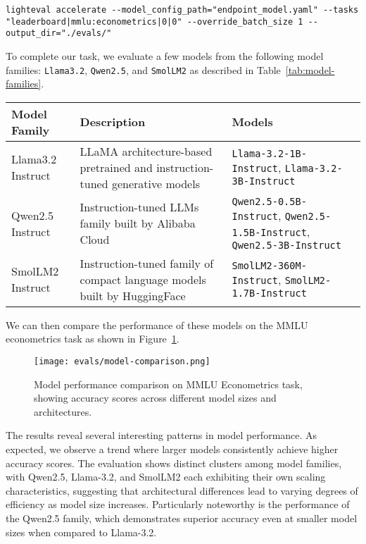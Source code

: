 \begin{verbatim}
lighteval accelerate --model_config_path="endpoint_model.yaml" --tasks "leaderboard|mmlu:econometrics|0|0" --override_batch_size 1 --output_dir="./evals/"
\end{verbatim}

To complete our task, we evaluate a few models from the following model families: \texttt{Llama3.2}, \texttt{Qwen2.5}, and \texttt{SmolLM2} as described in Table~\ref{tab:model-families}.

\begin{table*}[h]
    \begin{tabular}{lp{5.5cm}p{4.5cm}}
    \hline
    Model Family & Description & Models \\
    \hline
    Llama3.2 Instruct \cite{meta_llama_models} & LLaMA architecture-based \newline pretrained and instruction-tuned \newline generative models & \texttt{Llama-3.2-1B-Instruct}, 
    \texttt{Llama-3.2-3B-Instruct} \\
    \hline
    Qwen2.5 Instruct \cite{gpt2docs,hui2024qwen2,qwen2} & Instruction-tuned LLMs family \newline built by Alibaba Cloud & \texttt{Qwen2.5-0.5B-Instruct}, \texttt{Qwen2.5-1.5B-Instruct}, \texttt{Qwen2.5-3B-Instruct} \\
    \hline
    SmolLM2 Instruct \cite{allal2024SmolLM2}  & Instruction-tuned family of \newline compact language models \newline built by HuggingFace & \texttt{SmolLM2-360M-Instruct}, \texttt{SmolLM2-1.7B-Instruct} \\
    \hline
    \end{tabular}
    \caption{Model Families Evaluated Using LightEval}
    \label{tab:model-families}
    \end{table*}
We can then compare the performance of these models on the MMLU econometrics task as shown in Figure~\ref{fig:model-comparison}.

\begin{figure}[h]
\centering
\texttt{[image: evals/model-comparison.png]}
\caption{Model performance comparison on MMLU Econometrics task, showing accuracy scores across different model sizes and architectures.}
\label{fig:model-comparison}
\end{figure}

The results reveal several interesting patterns in model performance. As expected, we observe a trend where larger models consistently achieve higher accuracy scores. The evaluation shows distinct clusters among model families, with Qwen2.5, Llama-3.2, and SmolLM2 each exhibiting their own scaling characteristics, suggesting that architectural differences lead to varying degrees of efficiency as model size increases. Particularly noteworthy is the performance of the Qwen2.5 family, which demonstrates superior accuracy even at smaller model sizes when compared to Llama-3.2.

